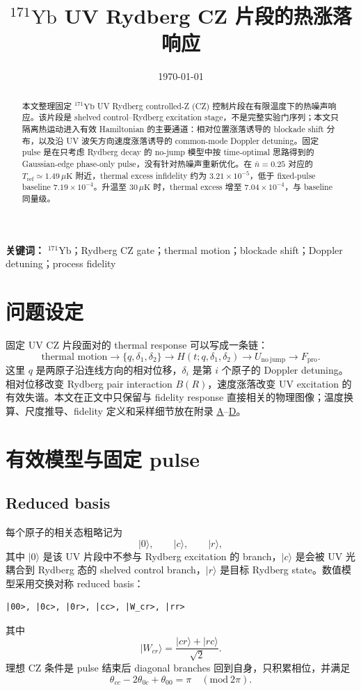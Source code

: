 \documentclass[UTF8,11pt]{ctexart}
\title{\(^{171}\mathrm{Yb}\) UV Rydberg CZ 片段的热涨落响应}
\author{}
\date{\today}
\numberwithin{equation}{section}
\begin{document}
\maketitle

\begin{abstract}
本文整理固定 \(^{171}\mathrm{Yb}\) UV Rydberg controlled-Z (CZ) 控制片段在有限温度下的热噪声响应。该片段是 shelved control--Rydberg excitation stage，不是完整实验门序列；本文只隔离热运动进入有效 Hamiltonian 的主要通道：相对位置涨落诱导的 blockade shift 分布，以及沿 UV 波矢方向速度涨落诱导的 common-mode Doppler detuning。固定 pulse 是在只考虑 Rydberg decay 的 no-jump 模型中按 time-optimal 思路得到的 Gaussian-edge phase-only pulse，没有针对热噪声重新优化。在 \(\bar n=0.25\) 对应的 \(T_\mathrm{ref}\simeq1.49\,\mu\mathrm{K}\) 附近，thermal excess infidelity 约为 \(3.21\times10^{-5}\)，低于 fixed-pulse baseline \(7.19\times10^{-4}\)。升温至 \(30\,\mu\mathrm{K}\) 时，thermal excess 增至 \(7.04\times10^{-4}\)，与 baseline 同量级。
\end{abstract}

\noindent\textbf{关键词：} \(^{171}\mathrm{Yb}\)；Rydberg CZ gate；thermal motion；blockade shift；Doppler detuning；process fidelity

\section{问题设定}

固定 UV CZ 片段面对的 thermal response 可以写成一条链：
\[
\text{thermal motion}
\longrightarrow
\{q,\delta_1,\delta_2\}
\longrightarrow
H(t;q,\delta_1,\delta_2)
\longrightarrow
U_\mathrm{no\ jump}
\longrightarrow
F_\mathrm{pro}.
\]
这里 \(q\) 是两原子沿连线方向的相对位移，\(\delta_i\) 是第 \(i\) 个原子的 Doppler detuning。相对位移改变 Rydberg pair interaction \(B(R)\)，速度涨落改变 UV excitation 的有效失谐。本文在正文中只保留与 fidelity response 直接相关的物理图像；温度换算、尺度推导、fidelity 定义和采样细节放在附录 \hyperref[app:nbar-temperature]{A}--\hyperref[app:numerics]{D}。

\section{有效模型与固定 pulse}
\subsection{Reduced basis}

每个原子的相关态粗略记为
\[
|0\rangle,\qquad |c\rangle,\qquad |r\rangle,
\]
其中 \(|0\rangle\) 是该 UV 片段中不参与 Rydberg excitation 的 branch，\(|c\rangle\) 是会被 UV 光耦合到 Rydberg 态的 shelved control branch，\(|r\rangle\) 是目标 Rydberg state。数值模型采用交换对称 reduced basis：
\begin{lstlisting}
|00>, |0c>, |0r>, |cc>, |W_cr>, |rr>
\end{lstlisting}
其中
\[
|W_{cr}\rangle=\frac{|cr\rangle+|rc\rangle}{\sqrt{2}}.
\]
理想 CZ 条件是 pulse 结束后 diagonal branches 回到自身，只积累相位，并满足
\[
\theta_{cc}-2\theta_{0c}+\theta_{00}=\pi\quad (\mathrm{mod}\ 2\pi).
\]
\end{document}
